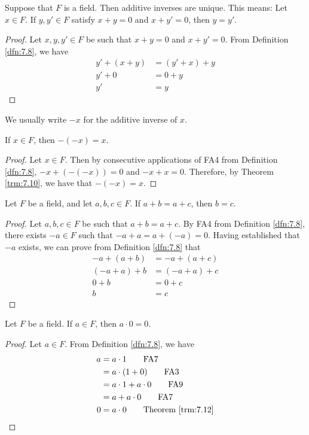 \documentclass[../main.tex]{subfiles}
\begin{document}
\begin{theorem}\label{trm:7.10}
    Suppose that $F$ is a field. Then additive inverses are unique. This means: Let $x\in F$. If $y,y'\in F$ satisfy $x+y=0$ and $x+y'=0$, then $y=y'$.
    \begin{proof}
        Let $x,y,y'\in F$ be such that $x+y=0$ and $x+y'=0$. From Definition \ref{dfn:7.8}, we have
        \begin{align*}
            y'+(x+y) &= (y'+x)+y\tag*{FA2}\\
            y'+0 &= 0+y\tag*{FA4}\\
            y' &= y\tag*{FA3}
        \end{align*}
    \end{proof}
\end{theorem}

We usually write $-x$ for the additive inverse of $x$.

\begin{corollary}\label{cly:7.11}
    If $x\in F$, then $-(-x)=x$.
    \begin{proof}
        Let $x\in F$. Then by consecutive applications of FA4 from Definition \ref{dfn:7.8}, $-x+(-(-x))=0$ and $-x+x=0$. Therefore, by Theorem \ref{trm:7.10}, we have that $-(-x)=x$.
    \end{proof}
\end{corollary}

\begin{theorem}\label{trm:7.12}
    Let $F$ be a field, and let $a,b,c\in F$. If $a+b=a+c$, then $b=c$.
    \begin{proof}
        Let $a,b,c\in F$ be such that $a+b=a+c$. By FA4 from Definition \ref{dfn:7.8}, there exists $-a\in F$ such that $-a+a=a+(-a)=0$. Having established that $-a$ exists, we can prove from Definition \ref{dfn:7.8} that
        \begin{align*}
            -a+(a+b) &= -a+(a+c)\\
            (-a+a)+b &= (-a+a)+c\tag*{FA2}\\
            0+b &= 0+c\tag*{FA4}\\
            b &= c\tag*{FA3}
        \end{align*}
    \end{proof}
\end{theorem}

\begin{theorem}\label{trm:7.13}
    Let $F$ be a field. If $a\in F$, then $a\cdot 0=0$.
    \begin{proof}
        Let $a\in F$. From Definition \ref{dfn:7.8}, we have
        \begin{align*}
            a &= a\cdot 1\tag*{FA7}\\
            &= a\cdot(1+0)\tag*{FA3}\\
            &= a\cdot 1+a\cdot 0\tag*{FA9}\\
            &= a+a\cdot 0\tag*{FA7}\\
            0 &= a\cdot 0\tag*{Theorem \ref{trm:7.12}}
        \end{align*}
    \end{proof}
\end{theorem}
\end{document}
